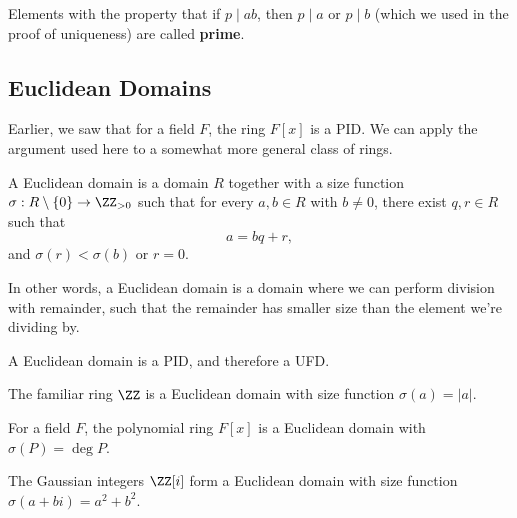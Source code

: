 \begin{note}
    Elements with the property that if $p \mid ab$, then $p \mid a$ or $p \mid b$ (which we used in the proof of uniqueness) are called \textbf{prime}. 
\end{note}

\subsection{Euclidean Domains}

Earlier, we saw that for a field $F$, the ring $F[x]$ is a PID. We can apply the argument used here to a somewhat more general class of rings. 

\begin{definition}
A Euclidean domain is a domain $R$ together with a size function $\sigma: R \setminus \{0\} \to \ZZ_{>0}$ such that for every $a, b \in R$ with $b \neq 0$, there exist $q, r \in R$ such that \[a = bq + r,\] and $\sigma(r) < \sigma(b)$ or $r = 0$. 
\end{definition}

In other words, a Euclidean domain is a domain where we can perform division with remainder, such that the remainder has smaller size than the element we're dividing by. 


\begin{proposition}\label{euclidean pid}
A Euclidean domain is a PID, and therefore a UFD. 
\end{proposition}

\begin{example}
The familiar ring $\ZZ$ is a Euclidean domain with size function $\sigma(a) = \lvert a\rvert$.
\end{example}

\begin{example}
For a field $F$, the polynomial ring $F[x]$ is a Euclidean domain with $\sigma(P) = \deg P$.
\end{example}

\begin{example}
The Gaussian integers $\ZZ[i]$ form a Euclidean domain with size function $\sigma(a + bi) = a^2 + b^2.$


\end{example}

